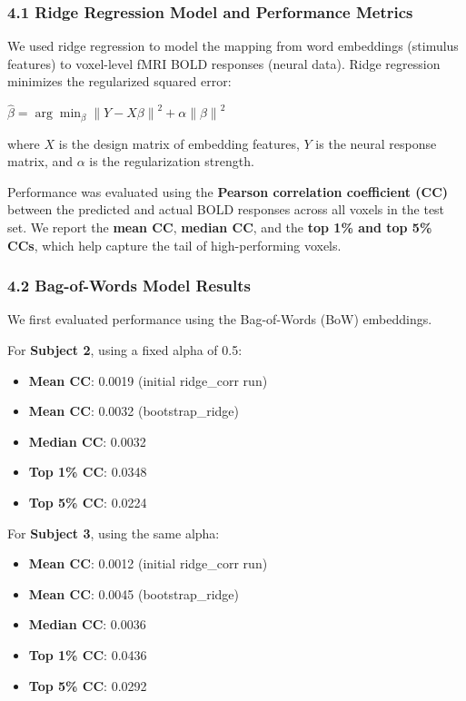 \documentclass[11pt]{article}
\begin{document}
\hypertarget{ridge-regression-model-and-performance-metrics}{%
\subsubsection{4.1 Ridge Regression Model and Performance
Metrics}\label{ridge-regression-model-and-performance-metrics}}

We used ridge regression to model the mapping from word embeddings
(stimulus features) to voxel-level fMRI BOLD responses (neural data).
Ridge regression minimizes the regularized squared error:

\(\hat{\beta} = \arg\min_\beta \left\| Y - X\beta \right\|^2 + \alpha \left\| \beta \right\|^2\)

where \(X\) is the design matrix of embedding features, \(Y\) is the
neural response matrix, and \(\alpha\) is the regularization strength.

Performance was evaluated using the \textbf{Pearson correlation
coefficient (CC)} between the predicted and actual BOLD responses across
all voxels in the test set. We report the \textbf{mean CC},
\textbf{median CC}, and the \textbf{top 1\% and top 5\% CCs}, which help
capture the tail of high-performing voxels.

\hypertarget{bag-of-words-model-results}{%
\subsubsection{4.2 Bag-of-Words Model
Results}\label{bag-of-words-model-results}}

We first evaluated performance using the Bag-of-Words (BoW) embeddings.

For \textbf{Subject 2}, using a fixed alpha of 0.5:

\begin{itemize}
\item
  \textbf{Mean CC}: 0.0019 (initial ridge\_corr run)
\item
  \textbf{Mean CC}: 0.0032 (bootstrap\_ridge)
\item
  \textbf{Median CC}: 0.0032
\item
  \textbf{Top 1\% CC}: 0.0348
\item
  \textbf{Top 5\% CC}: 0.0224
\end{itemize}

For \textbf{Subject 3}, using the same alpha:

\begin{itemize}
\item
  \textbf{Mean CC}: 0.0012 (initial ridge\_corr run)
\item
  \textbf{Mean CC}: 0.0045 (bootstrap\_ridge)
\item
  \textbf{Median CC}: 0.0036
\item
  \textbf{Top 1\% CC}: 0.0436
\item
  \textbf{Top 5\% CC}: 0.0292
\end{itemize}
\end{document}
